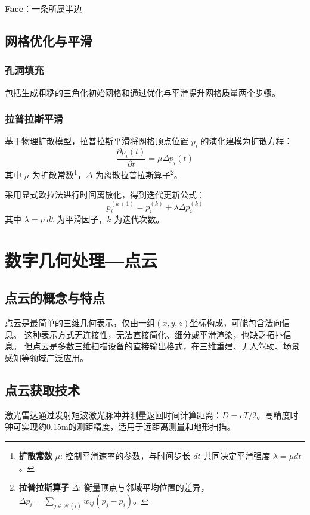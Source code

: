 \documentclass[12pt]{article}
\begin{document}
    \textbf{Face}：一条所属半边

\subsection{网格优化与平滑}

\subsubsection{孔洞填充}
包括生成粗糙的三角化初始网格和通过优化与平滑提升网格质量两个步骤。

\subsubsection{拉普拉斯平滑}

基于物理扩散模型，拉普拉斯平滑将网格顶点位置 $p_i$ 的演化建模为扩散方程：
\[
\frac{\partial p_i(t)}{\partial t} = \mu \Delta p_i(t)
\]
其中 $\mu$ 为扩散常数\footnote{\textbf{扩散常数} $\mu$: 控制平滑速率的参数，与时间步长 $dt$ 共同决定平滑强度 $\lambda = \mu dt$。}，$\Delta$ 为离散拉普拉斯算子\footnote{\textbf{拉普拉斯算子} $\Delta$: 衡量顶点与邻域平均位置的差异，$\Delta p_i = \sum_{j \in \mathcal{N}(i)} w_{ij}(p_j - p_i)$。}。

采用显式欧拉法进行时间离散化，得到迭代更新公式：
\[
\boxed{p_i^{(k+1)} = p_i^{(k)} + \lambda \Delta p_i^{(k)}}
\]
其中 $\lambda = \mu \, dt$ 为平滑因子，$k$ 为迭代次数。

\newpage

\section{数字几何处理—点云}

\subsection{点云的概念与特点}

点云是最简单的三维几何表示，仅由一组$(x, y, z)$坐标构成，可能包含法向信息。
这种表示方式无连接性，无法直接简化、细分或平滑渲染，也缺乏拓扑信息。
但点云是多数三维扫描设备的直接输出格式，在三维重建、无人驾驶、场景感知等领域广泛应用。

\subsection{点云获取技术}

激光雷达通过发射短波激光脉冲并测量返回时间计算距离：$D = cT/2$。高精度时钟可实现约0.15m的测距精度，适用于远距离测量和地形扫描。
\end{document}
